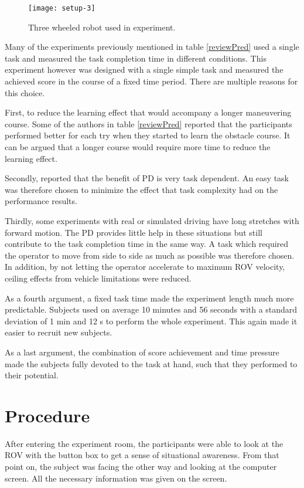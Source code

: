 \begin{figure}[h!]
    \centering
    \texttt{[image: setup-3]}
    \caption{Three wheeled robot used in experiment.}
    \label{setup3}
\end{figure}

Many of the experiments previously mentioned in table \ref{reviewPred} used a single task and measured the task completion time in different conditions. This experiment however was designed with a single simple task and measured the achieved score in the course of a fixed time period. There are multiple reasons for this choice. 

First, to reduce the learning effect that would accompany a longer maneuvering course. Some of the authors in table \ref{reviewPred} reported that the participants performed better for each try when they started to learn the obstacle course. It can be argued that a longer course would require more time to reduce the learning effect. 

Secondly, \citep{Chen2007} reported that the benefit of PD is very task dependent. An easy task was therefore chosen to minimize the effect that task complexity had on the performance results. 

Thirdly, some experiments with real or simulated driving have long stretches with forward motion. The PD provides little help in these situations but still contribute to the task completion time in the same way. A task which required the operator to move from side to side as much as possible was therefore chosen. In addition, by not letting the operator accelerate to maximum ROV velocity, ceiling effects from vehicle limitations were reduced. 

As a fourth argument, a fixed task time made the experiment length much more predictable. Subjects used on average 10 minutes and 56 seconds with a standard deviation of 1 min and 12 s to perform the whole experiment. This again made it easier to recruit new subjects. 

As a last argument, the combination of score achievement and time pressure made the subjects fully devoted to the task at hand, such that they performed to their potential.

\section{Procedure}

After entering the experiment room, the participants were able to look at the ROV with the button box to get a sense of situational awareness. From that point on, the subject was facing the other way and looking at the computer screen. All the necessary information was given on the screen.

